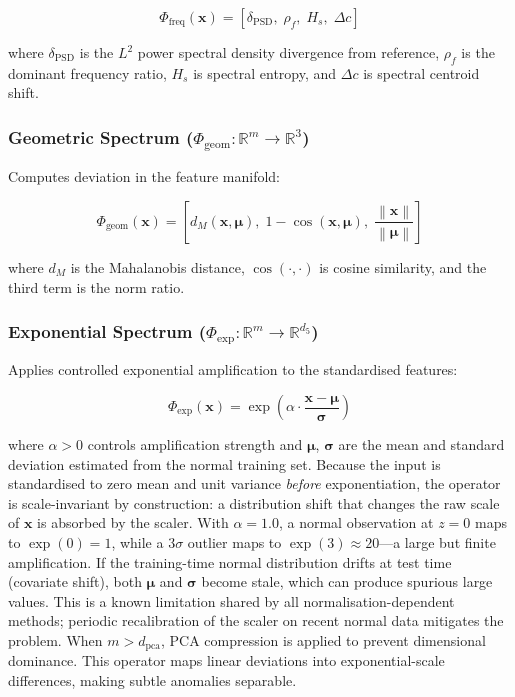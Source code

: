 \documentclass[journal]{IEEEtran}
\newcommand{\R}{\mathbb{R}}
\newcommand{\norm}[1]{\left\lVert#1\right\rVert}
\begin{document}
\begin{equation}
\Phi_{\text{freq}}(\mathbf{x}) = \left[\delta_{\text{PSD}},\; \rho_f,\; H_s,\; \Delta c\right]
\label{eq:phi_freq}
\end{equation}

where $\delta_{\text{PSD}}$ is the $L^2$ power spectral density divergence from reference, $\rho_f$ is the dominant frequency ratio, $H_s$ is spectral entropy, and $\Delta c$ is spectral centroid shift.

\subsubsection{Geometric Spectrum ($\Phi_{\text{geom}}: \R^m \to \R^3$)}

Computes deviation in the feature manifold:

\begin{equation}
\Phi_{\text{geom}}(\mathbf{x}) = \left[d_M(\mathbf{x}, \boldsymbol{\mu}),\; 1 - \cos(\mathbf{x}, \boldsymbol{\mu}),\; \frac{\norm{\mathbf{x}}}{\norm{\boldsymbol{\mu}}}\right]
\label{eq:phi_geom}
\end{equation}

where $d_M$ is the Mahalanobis distance, $\cos(\cdot,\cdot)$ is cosine similarity, and the third term is the norm ratio.

\subsubsection{Exponential Spectrum ($\Phi_{\text{exp}}: \R^m \to \R^{d_5}$)}

Applies controlled exponential amplification to the standardised features:

\begin{equation}
\Phi_{\text{exp}}(\mathbf{x}) = \exp\!\left(\alpha \cdot \frac{\mathbf{x} - \boldsymbol{\mu}}{\boldsymbol{\sigma}}\right)
\label{eq:phi_exp}
\end{equation}

where $\alpha > 0$ controls amplification strength and $\boldsymbol{\mu}$, $\boldsymbol{\sigma}$ are the mean and standard deviation estimated from the normal training set.  Because the input is standardised to zero mean and unit variance \emph{before} exponentiation, the operator is scale-invariant by construction: a distribution shift that changes the raw scale of $\mathbf{x}$ is absorbed by the scaler.  With $\alpha{=}1.0$, a normal observation at $z{=}0$ maps to $\exp(0){=}1$, while a $3\sigma$ outlier maps to $\exp(3) \approx 20$---a large but finite amplification.  If the training-time normal distribution drifts at test time (covariate shift), both $\boldsymbol{\mu}$ and $\boldsymbol{\sigma}$ become stale, which can produce spurious large values.  This is a known limitation shared by all normalisation-dependent methods; periodic recalibration of the scaler on recent normal data mitigates the problem.  When $m > d_{\text{pca}}$, PCA compression is applied to prevent dimensional dominance. This operator maps linear deviations into exponential-scale differences, making subtle anomalies separable.
\end{document}

